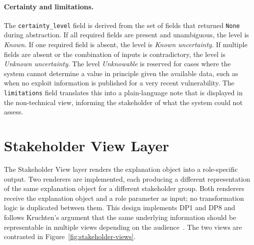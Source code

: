 \paragraph{Certainty and limitations.} The \texttt{certainty\_level} field is derived from the set of fields that returned \texttt{None} during abstraction. If all required fields are present and unambiguous, the level is \textit{Known}. If one required field is absent, the level is \textit{Known uncertainty}. If multiple fields are absent or the combination of inputs is contradictory, the level is \textit{Unknown uncertainty}. The level \textit{Unknowable} is reserved for cases where the system cannot determine a value in principle given the available data, such as when no exploit information is published for a very recent vulnerability. The \texttt{limitations} field translates this into a plain-language note that is displayed in the non-technical view, informing the stakeholder of what the system could not assess.

\section{Stakeholder View Layer}
\label{sec:stakeholder-view}

The Stakeholder View layer renders the explanation object into a role-specific output. Two renderers are implemented, each producing a different representation of the same explanation object for a different stakeholder group. Both renderers receive the explanation object and a role parameter as input; no transformation logic is duplicated between them. This design implements DP1 and DP8 and follows Kruchten's argument that the same underlying information should be representable in multiple views depending on the audience~\cite{kruchten1995viewmodel}. The two views are contrasted in Figure~\ref{fig:stakeholder-views}.

